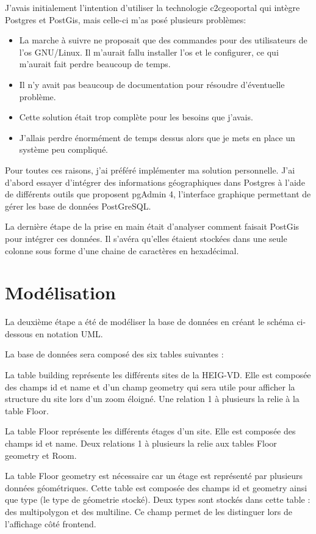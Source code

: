 \documentclass[
    iai, %
    il, %
]{heig-tb}
\begin{document}
J'avais initialement l'intention d'utiliser la technologie c2cgeoportal qui intègre Postgres et PostGis,
mais celle-ci m'as posé plusieurs problèmes:

\begin{itemize}
    \item La marche à suivre ne proposait que des commandes pour des utilisateurs de l'os GNU/Linux. Il m'aurait fallu installer l'os et le configurer, ce qui m'aurait fait perdre beaucoup de temps.
    \item Il n'y avait pas beaucoup de documentation pour résoudre d'éventuelle problème.
    \item Cette solution était trop complète pour les besoins que j'avais.
    \item J'allais perdre énormément de temps dessus alors que je mets en place un système peu compliqué.
\end{itemize}

Pour toutes ces raisons, j'ai préféré implémenter ma solution personnelle.
J'ai d'abord essayer d'intégrer des informations géographiques dans Postgres à l'aide de différents outils que proposent pgAdmin 4,
l'interface graphique permettant de gérer les base de données PostGreSQL.

La dernière étape de la prise en main était d'analyser comment faisait PostGis pour intégrer ces données.
Il s'avéra qu'elles étaient stockées dans une seule colonne sous forme d'une chaine de caractères en hexadécimal.

\section{Modélisation}
La deuxième étape a été de modéliser la base de données en créant le schéma ci-dessous en notation UML.

La base de données sera composé des six tables suivantes :

La table building représente les différents sites de la HEIG-VD. Elle est composée des champs id
et name et d'un champ geometry qui sera utile pour afficher la structure du site lors d'un zoom éloigné.
Une relation 1 à plusieurs la relie à la table Floor.

La table Floor représente les différents étages d'un site. Elle est composée des champs id et name.
Deux relations 1 à plusieurs la relie aux tables Floor geometry et Room.

La table Floor geometry est nécessaire car un étage est représenté par plusieurs données géométriques.
Cette table est composée des champs id et geometry ainsi que type (le type de géometrie stocké).
Deux types sont stockés dans cette table : des multipolygon et des multiline.
Ce champ permet de les distinguer lors de l'affichage côté frontend.
\end{document}
